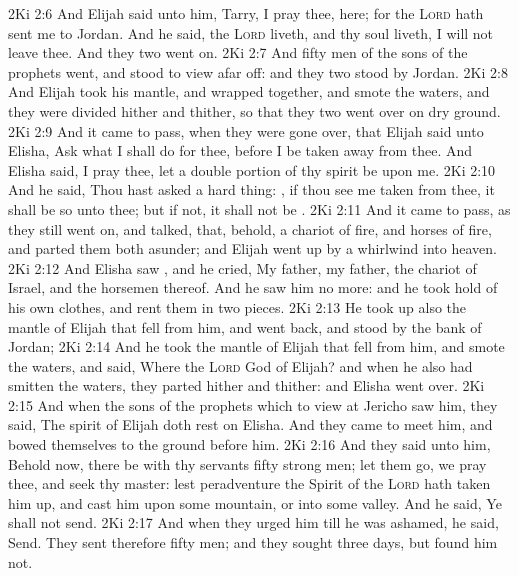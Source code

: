 \vs 2Ki 2:6 And Elijah said unto him, Tarry, I pray thee, here; for the \textsc{Lord} hath sent me to Jordan. And he said,  the \textsc{Lord} liveth, and  thy soul liveth, I will not leave thee. And they two went on.
\vs 2Ki 2:7 And fifty men of the sons of the prophets went, and stood to view afar off: and they two stood by Jordan.
\vs 2Ki 2:8 And Elijah took his mantle, and wrapped  together, and smote the waters, and they were divided hither and thither, so that they two went over on dry ground.
\vs 2Ki 2:9 And it came to pass, when they were gone over, that Elijah said unto Elisha, Ask what I shall do for thee, before I be taken away from thee. And Elisha said, I pray thee, let a double portion of thy spirit be upon me.
\vs 2Ki 2:10 And he said, Thou hast asked a hard thing: , if thou see me  taken from thee, it shall be so unto thee; but if not, it shall not be .
\vs 2Ki 2:11 And it came to pass, as they still went on, and talked, that, behold,  a chariot of fire, and horses of fire, and parted them both asunder; and Elijah went up by a whirlwind into heaven.
\vs 2Ki 2:12 And Elisha saw , and he cried, My father, my father, the chariot of Israel, and the horsemen thereof. And he saw him no more: and he took hold of his own clothes, and rent them in two pieces.
\vs 2Ki 2:13 He took up also the mantle of Elijah that fell from him, and went back, and stood by the bank of Jordan;
\vs 2Ki 2:14 And he took the mantle of Elijah that fell from him, and smote the waters, and said, Where  the \textsc{Lord} God of Elijah? and when he also had smitten the waters, they parted hither and thither: and Elisha went over.
\vs 2Ki 2:15 And when the sons of the prophets which  to view at Jericho saw him, they said, The spirit of Elijah doth rest on Elisha. And they came to meet him, and bowed themselves to the ground before him.
\vs 2Ki 2:16 And they said unto him, Behold now, there be with thy servants fifty strong men; let them go, we pray thee, and seek thy master: lest peradventure the Spirit of the \textsc{Lord} hath taken him up, and cast him upon some mountain, or into some valley. And he said, Ye shall not send.
\vs 2Ki 2:17 And when they urged him till he was ashamed, he said, Send. They sent therefore fifty men; and they sought three days, but found him not.
